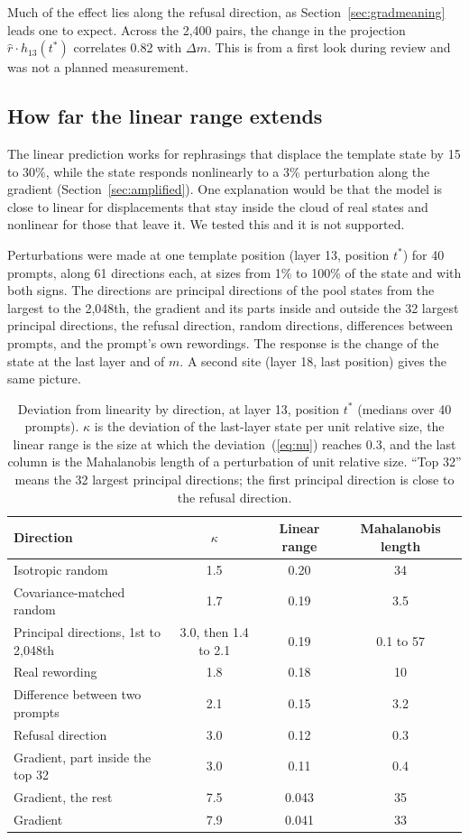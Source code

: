 \documentclass[11pt]{article}
\newcommand{\Dm}{\Delta m}
\begin{document}
Much of the effect lies along the refusal direction, as Section~\ref{sec:gradmeaning} leads one to expect. Across the 2{,}400 pairs, the change in the projection $\hat r\cdot h_{13}(t^*)$ correlates 0.82 with $\Dm$. This is from a first look during review and was not a planned measurement.

\subsection{How far the linear range extends}
\label{sec:linrange}

The linear prediction works for rephrasings that displace the template state by 15 to 30\%, while the state responds nonlinearly to a 3\% perturbation along the gradient (Section~\ref{sec:amplified}). One explanation would be that the model is close to linear for displacements that stay inside the cloud of real states and nonlinear for those that leave it. We tested this and it is not supported.

Perturbations were made at one template position (layer 13, position $t^*$) for 40 prompts, along 61 directions each, at sizes from 1\% to 100\% of the state and with both signs. The directions are principal directions of the pool states from the largest to the 2{,}048th, the gradient and its parts inside and outside the 32 largest principal directions, the refusal direction, random directions, differences between prompts, and the prompt's own rewordings. The response is the change of the state at the last layer and of $m$. A second site (layer 18, last position) gives the same picture.

\begin{table}[ht]
\centering
\caption{Deviation from linearity by direction, at layer 13, position $t^*$ (medians over 40 prompts). $\kappa$ is the deviation of the last-layer state per unit relative size, the linear range is the size at which the deviation~(\ref{eq:nu}) reaches 0.3, and the last column is the Mahalanobis length of a perturbation of unit relative size. ``Top 32'' means the 32 largest principal directions; the first principal direction is close to the refusal direction.}
\label{tab:linrange}
\begin{tabular}{lccc}
\toprule
Direction & $\kappa$ & Linear range & Mahalanobis length \\
\midrule
Isotropic random & 1.5 & 0.20 & 34 \\
Covariance-matched random & 1.7 & 0.19 & 3.5 \\
Principal directions, 1st to 2{,}048th & 3.0, then 1.4 to 2.1 & 0.19 & 0.1 to 57 \\
Real rewording & 1.8 & 0.18 & 10 \\
Difference between two prompts & 2.1 & 0.15 & 3.2 \\
Refusal direction & 3.0 & 0.12 & 0.3 \\
Gradient, part inside the top 32 & 3.0 & 0.11 & 0.4 \\
Gradient, the rest & 7.5 & 0.043 & 35 \\
Gradient & 7.9 & 0.041 & 33 \\
\bottomrule
\end{tabular}
\end{table}
\end{document}

